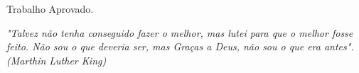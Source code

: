 \documentclass[12pt,oneside,a4paper,english,french,spanish,brazil]{abntex2}
\begin{document}
\begin{folhadeaprovacao}

  \begin{center}
    {\ABNTEXchapterfont\large\imprimirautor}

    \vspace*{\fill}\vspace*{\fill}
    {\ABNTEXchapterfont\bfseries\Large\imprimirtitulo}
    \vspace*{\fill}

    \hspace{.45\textwidth}
    \begin{minipage}{.5\textwidth}
        \imprimirpreambulo
    \end{minipage}%
    \vspace*{\fill}
   \end{center}

   Trabalho Aprovado. \\


   \begin{center}
    \vspace*{0.5cm}
    {\large\imprimirlocal}
    {\large\imprimirdata}
    \vspace*{1cm}
  \end{center}

\end{folhadeaprovacao}







\begin{epigrafe}
    \vspace*{\fill}
	\begin{flushright}
		\textit{"Talvez n\~{a}o tenha conseguido fazer o melhor, mas lutei para que o melhor fosse feito.
        N\~{a}o sou o que deveria ser, mas Gra\c{c}as a Deus, n\~{a}o sou o que era antes".\\(Marthin Luther King) }
	\end{flushright}
\end{epigrafe}
\end{document}
